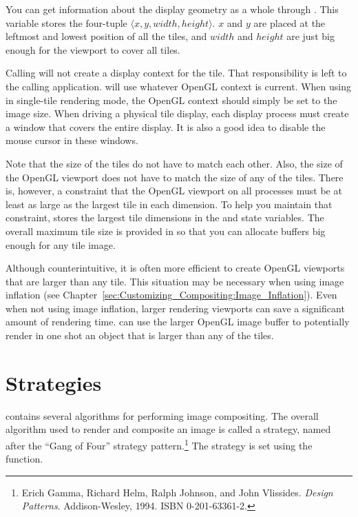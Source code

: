 You can get information about the display geometry as a whole through
.  This variable stores the four-tuple
$\langle x, y, width, height \rangle$.  $x$ and $y$ are placed at the
leftmost and lowest position of all the tiles, and $width$ and $height$ are
just big enough for the viewport to cover all tiles.

Calling  will not create a display context for the tile.
That responsibility is left to the calling application.  \IceT will use
whatever OpenGL context is current.  When using \IceT
in single-tile rendering mode, the OpenGL
context should simply be set to the image size.  When driving a physical
tile display, each display process must create a window that covers the
entire display.  It is also a good idea to disable the mouse cursor in
these windows.

Note that the size of the tiles do not have to match each other.  Also, the
size of the OpenGL viewport does not have to match the size of any of the
tiles.  There is, however, a constraint that the OpenGL viewport on all
processes must be at least as large as the largest tile in each dimension.
To help you maintain that constraint, \IceT stores the largest tile
dimensions in the  and
 state variables.  The overall maximum tile
size is provided in  so that you can
allocate buffers big enough for any tile image.

Although counterintuitive, it is often more efficient to create OpenGL
viewports that are larger than any tile.  This situation may be necessary
when using image inflation (see
Chapter~\ref{sec:Customizing_Compositing:Image_Inflation}).  Even when not
using image inflation, larger rendering viewports can save a significant
amount of rendering time.  \IceT can use the larger OpenGL image buffer to
potentially render in one shot an object that is larger than any of the
tiles.



\section{Strategies}
\label{sec:Basic_Usage:Strategies}


\IceT contains several algorithms for performing image compositing.  The
overall algorithm used to render and composite an image is called a
strategy, named after the ``Gang of Four'' strategy pattern.\footnote{Erich
  Gamma, Richard Helm, Ralph Johnson, and John Vlissides.  \emph{Design
    Patterns}.  Addison-Wesley, 1994.  ISBN 0-201-63361-2.}  The strategy
is set using the  function.

